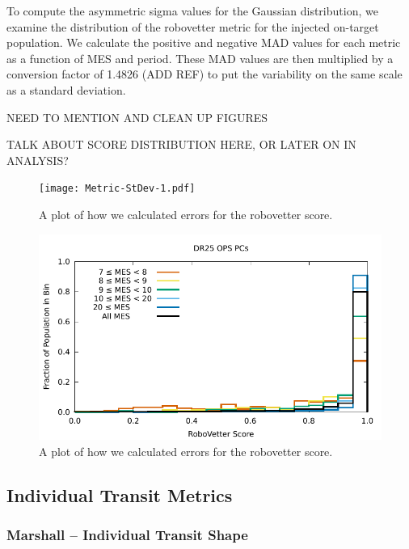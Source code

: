 To compute the asymmetric sigma values for the Gaussian distribution, we examine the distribution of the robovetter metric for the injected on-target population. We calculate the positive and negative MAD values for each metric as a function of MES and period. These MAD values are then multiplied by a conversion factor of 1.4826 (ADD REF) to put the variability on the same scale as a standard deviation.

NEED TO MENTION AND CLEAN UP FIGURES

TALK ABOUT SCORE DISTRIBUTION HERE, OR LATER ON IN ANALYSIS?

\begin{figure}
\centering
\texttt{[image: Metric-StDev-1.pdf]}
\caption{A plot of how we calculated errors for the robovetter score.}
\label{score-fig-1}
\end{figure}

\begin{figure}
\centering
\includegraphics[width=\linewidth]{Scores-1.pdf}
\caption{A plot of how we calculated errors for the robovetter score.}
\label{score-fig-2}
\end{figure}


\subsection{Individual Transit Metrics}

\subsubsection{Marshall -- Individual Transit Shape}

